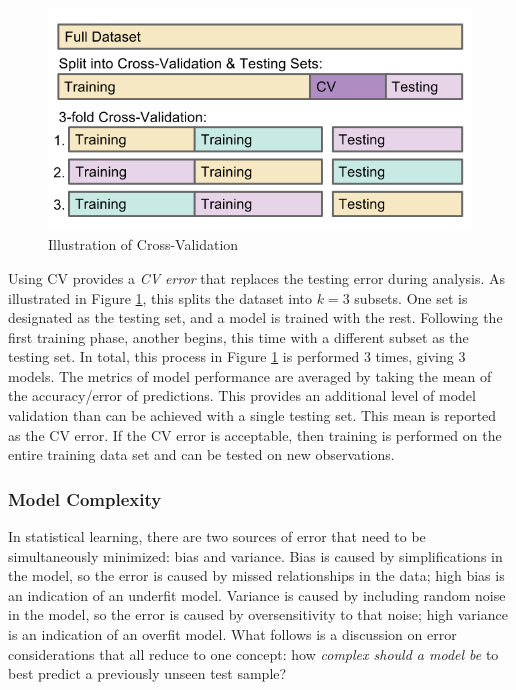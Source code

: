 \begin{figure}[!htb]
  \centering
  \includegraphics[width=0.85\linewidth]{./chapters/litrev/cverror.png}
  \caption{Illustration of Cross-Validation}
  \label{fig:cverror}
\end{figure}

Using \gls{CV} provides a \textit{\gls{CV} error} that replaces the testing
error during analysis.  As illustrated in Figure \ref{fig:cverror}, this splits
the dataset into $k=3$ subsets. One set is designated as the testing set, and a
model is trained with the rest. Following the first training phase, another
begins, this time with a different subset as the testing set.  In total, this
process in Figure \ref{fig:cverror} is performed $3$ times, giving $3$ models.
The metrics of model performance are averaged by taking the mean of the
accuracy/error of predictions.  This provides an additional level of model
validation than can be achieved with a single testing set. This mean is
reported as the \gls{CV} error. If the \gls{CV} error is acceptable, then
training is performed on the entire training data set and can be tested on new
observations.

\subsubsection{Model Complexity}
\label{sec:complexity}

In statistical learning, there are two sources of error that need to be
simultaneously minimized: bias and variance. Bias is caused by simplifications
in the model, so the error is caused by missed relationships in the data; high
bias is an indication of an underfit model.  Variance is caused by including
random noise in the model, so the error is caused by oversensitivity to that
noise; high variance is an indication of an overfit model. What follows is a
discussion on error considerations that all reduce to one concept: how
\textit{complex should a model be} to best predict a previously unseen test
sample?

